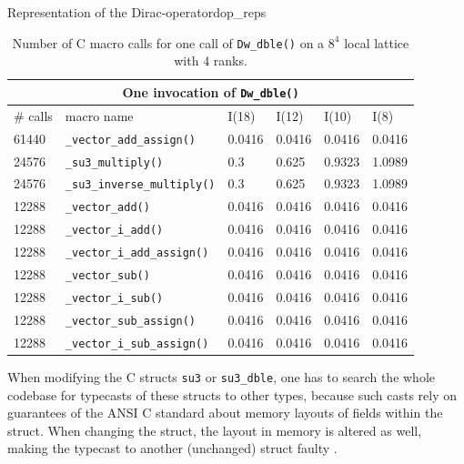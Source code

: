 \documentclass{article}
\theoremstyle{plain} %
\theoremstyle{convention} %
\theoremstyle{remark} %
\def\code#1{\texttt{#1}}
\numberwithin{equation}{section}
\begin{document}
\begin{proposal}{Representation of the Dirac-operator}{dop_reps}
\begin{table}[H]
\centering
    \begin{tabular}{ |p{1.2cm}|p{4cm}|p{1.2cm}|p{1.2cm}|p{1.2cm}|p{1.2cm}|  }
        \hline
        \multicolumn{6}{|c|}{One invocation of \code{Dw\_dble()}} \\
        \hline
        \# calls & macro name & I(18) & I(12) & I(10) & I(8) \\
        \hline
        61440 & \code{\_vector\_add\_assign()}    & 0.0416 & 0.0416 & 0.0416 & 0.0416 \\
        24576 & \code{\_su3\_multiply()}          & 0.3    & 0.625 & 0.9323 & 1.0989 \\
        24576 & \code{\_su3\_inverse\_multiply()} & 0.3    & 0.625 & 0.9323 & 1.0989 \\
        12288 & \code{\_vector\_add()}            & 0.0416 & 0.0416 & 0.0416 & 0.0416 \\
        12288 & \code{\_vector\_i\_add()}         & 0.0416 & 0.0416 & 0.0416 & 0.0416 \\
        12288 & \code{\_vector\_i\_add\_assign()} & 0.0416 & 0.0416 & 0.0416 & 0.0416 \\
        12288 & \code{\_vector\_sub()}            & 0.0416 & 0.0416 & 0.0416 & 0.0416 \\
        12288 & \code{\_vector\_i\_sub()}         & 0.0416 & 0.0416 & 0.0416 & 0.0416 \\
        12288 & \code{\_vector\_sub\_assign()}    & 0.0416 & 0.0416 & 0.0416 & 0.0416 \\
        12288 & \code{\_vector\_i\_sub\_assign()} & 0.0416 & 0.0416 & 0.0416 & 0.0416 \\
        \hline
    \end{tabular}
    \caption{Number of C macro calls for one call of \code{Dw\_dble()} on a $8^4$ local lattice with $4$ ranks.}
    \label{tab:dw_dble}
\end{table}

When modifying the C structs \code{su3} or \code{su3\_dble}, one has to search the whole codebase for typecasts of these structs to other types, because such casts rely on guarantees of the ANSI C standard about memory layouts of fields within the struct. When changing the struct, the layout in memory is altered as well, making the typecast to another (unchanged) struct faulty \cite{siff1999}.

\end{proposal}
\end{document}
